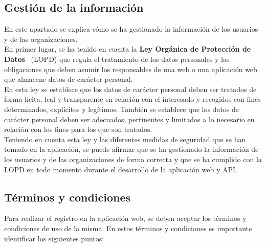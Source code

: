 \subsection{Gestión de la información}\label{subsec:gestion-de-la-informacion}

En este apartado se explica cómo se ha gestionado la información de los usuarios y de las organizaciones. \\

En primer lugar, se ha tenido en cuenta la \textbf{Ley Orgánica de Protección de Datos}~\cite{ley-proteccion-datos} (LOPD) que
regula el tratamiento de los datos personales y las obligaciones que deben asumir los responsables de una web o una
aplicación web que almacene datos de carácter personal. \\

En esta ley se establece que los datos de carácter personal deben ser tratados de forma lícita, leal y transparente en
relación con el interesado y recogidos con fines determinados, explícitos y legítimos. También se establece que los datos
de carácter personal deben ser adecuados, pertinentes y limitados a lo necesario en relación con los fines para los que
son tratados. \\

Teniendo en cuenta esta ley y las diferentes medidas de seguridad que se han tomado en la aplicación, se puede afirmar
que se ha gestionado la información de los usuarios y de las organizaciones de forma correcta y que se ha cumplido con
la LOPD en todo momento durante el desarrollo de la aplicación web y API.

\subsection{Términos y condiciones}\label{subsec:terminos-y-condiciones}

Para realizar el registro en la aplicación web, se deben aceptar los términos y condiciones de uso de la misma. En estos
términos y condiciones es importante identificar los siguientes puntos:

